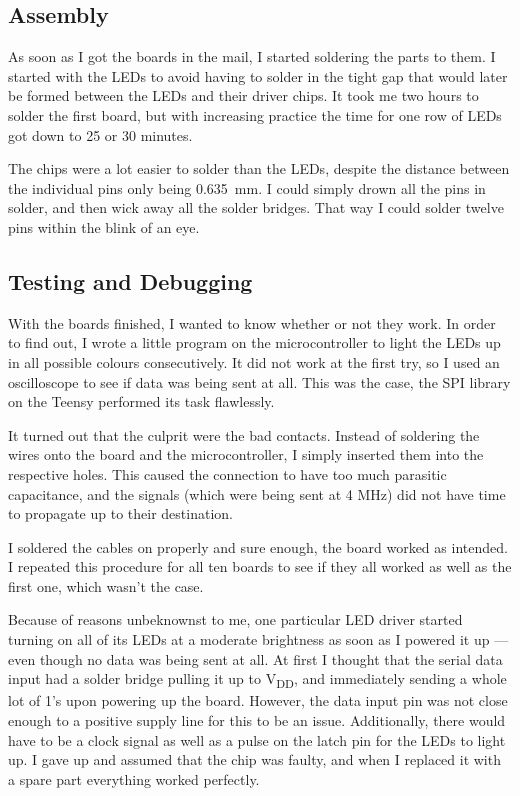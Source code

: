 \documentclass[a4paper, 11pt, titlepage]{report}
\def \vdd {V\textsubscript{DD}}
\begin{document}
\subsection{Assembly}

As soon as I got the boards in the mail, I started soldering the parts to them. I started with the
LEDs to avoid having to solder in the tight gap that would later be formed between the LEDs and
their driver chips. It took me two hours to solder the first board, but with increasing practice
the time for one row of LEDs got down to 25 or 30 minutes.

The chips were a lot easier to solder than the LEDs, despite the distance between the individual
pins only being \SI{0.635}{\milli\meter}. I could simply drown all the pins in solder, and then
wick away all the solder bridges. That way I could solder twelve pins within the blink of an eye.




\subsection {Testing and Debugging}

With the boards finished, I wanted to know whether or not they work. In order to find out, I wrote
a little program on the microcontroller to light the LEDs up in all possible colours consecutively.
It did not work at the first try, so I used an oscilloscope to see if data was being sent at all.
This was the case, the SPI library on the Teensy performed its task flawlessly.

It turned out that the culprit were the bad contacts. Instead of soldering the wires onto the board
and the microcontroller, I simply inserted them into the respective holes. This caused the
connection to have too much parasitic capacitance, and the signals (which were being sent at 4 MHz)
did not have time to propagate up to their destination.

I soldered the cables on properly and sure enough, the board worked as intended. I repeated this
procedure for all ten boards to see if they all worked as well as the first one, which wasn't the
case.

Because of reasons unbeknownst to me, one particular LED driver started turning on all of its LEDs
at a moderate brightness as soon as I powered it up --- even though no data was being sent at all.
At first I thought that the serial data input had a solder bridge pulling it up to \vdd, and
immediately sending a whole lot of 1's upon powering up the board. However, the data input pin was
not close enough to a positive supply line for this to be an issue. Additionally, there would have
to be a clock signal as well as a pulse on the latch pin for the LEDs to light up. I gave up and
assumed that the chip was faulty, and when I replaced it with a spare part everything worked
perfectly.
\end{document}
